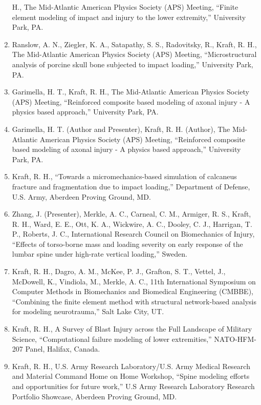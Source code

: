 \documentclass[11pt]{article}
\begin{document}
\begin{enumerate}
H., The
  Mid-Atlantic American Physics Society (APS) Meeting, ``Finite element
  modeling of impact and injury to the lower extremity,'' University
  Park, PA.
\item
  Ranslow, A. 
N., Ziegler, K. 
A., Satapathy, S. 
S., Radovitsky, R.,
  Kraft, R. 
H., The Mid-Atlantic American Physics Society (APS) Meeting,
  ``Microstructural analysis of porcine skull bone subjected to impact
  loading,'' University Park, PA.
\item
  Garimella, H. 
T., Kraft, R. 
H., The Mid-Atlantic American Physics
  Society (APS) Meeting, ``Reinforced composite based modeling of axonal
  injury - A physics based approach,'' University Park, PA.
\item
  Garimella, H. 
T. 
(Author and Presenter), Kraft, R. 
H. 
(Author), The
  Mid-Atlantic American Physics Society (APS) Meeting, ``Reinforced
  composite based modeling of axonal injury - A physics based approach,''
  University Park, PA.
\item
  Kraft, R. 
H., ``Towards a micromechanics-based simulation of calcaneus
  fracture and fragmentation due to impact loading,'' Department of
  Defense, U.S. 
Army, Aberdeen Proving Ground, MD.
\item
  Zhang, J. 
(Presenter), Merkle, A. 
C., Carneal, C. 
M., Armiger, R. 
S.,
  Kraft, R. 
H., Ward, E. 
E., Ott, K. 
A., Wickwire, A. 
C., Dooley, C. 
J.,
  Harrigan, T. 
P., Roberts, J. 
C., International Research Council on
  Biomechanics of Injury, ``Effects of torso-borne mass and loading
  severity on early response of the lumbar spine under high-rate
  vertical loading,'' Sweden.
\item
  Kraft, R. 
H., Dagro, A. 
M., McKee, P. 
J., Grafton, S. 
T., Vettel, J.,
  McDowell, K., Vindiola, M., Merkle, A. 
C., 11th International
  Symposium on Computer Methods in Biomechanics and Biomedical
  Engineering (CMBBE), ``Combining the finite element method with
  structural network-based analysis for modeling neurotrauma,'' Salt Lake
  City, UT.
\item
  Kraft, R. 
H., A Survey of Blast Injury across the Full Landscape of
  Military Science, ``Computational failure modeling of lower
  extremities,'' NATO-HFM-207 Panel, Halifax, Canada.
\item
  Kraft, R. 
H., U.S. 
Army Research Laboratory/U.S. 
Army Medical Research
  and Material Command Home on Home Workshop, ``Spine modeling efforts
  and opportunities for future work,'' U.S Army Research Laboratory
  Research Portfolio Showcase, Aberdeen Proving Ground, MD.

\end{enumerate}
\end{document}
